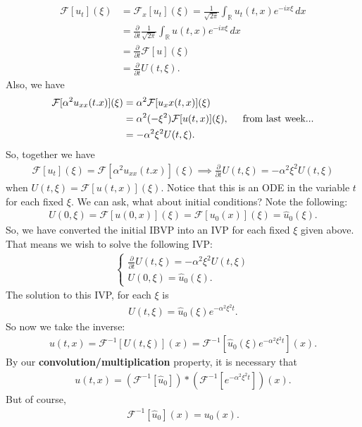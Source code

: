 \documentclass{article}
\theoremstyle{definition}
\newcommand{\p}{\partial}
\newcommand{\R}{\mathbb{R}}
\newcommand{\F}{\mathcal{F}}
\newcommand{\al}{\alpha}
\newcommand{\f}[2]{\frac{#1}{#2}}
\newcommand{\lp}{\left(}
\newcommand{\rp}{\right)}
\newcommand{\lb}{\left[}
\newcommand{\rb}{\right]}
\begin{document}
\begin{align*}
\F[u_t](\xi) &= \F_x[u_t](\xi) = \f{1}{\sqrt{2\pi}}\int_\R u_t(t,x) e^{-i x \xi}\,dx\\
&= \f{\p}{\p t}\f{1}{\sqrt{2\pi}}\int_\R u(t,x)e^{-ix\xi}\,dx\\
&= \f{\p}{\p t}\F[u](\xi)\\
&= \f{\p}{\p t}U(t,\xi).
\end{align*}
Also, we have
\begin{align*}
\F[\alpha^2 u_{xx}(t.x)](\xi) &= \alpha^2 \F[u_xx(t,x)](\xi)\\
&= \alpha^2(-\xi^2)\F[u(t,x)](\xi), \hspace{0.5cm}\text{from last week...}\\
&= -\al^2\xi^2 U(t,\xi).
\end{align*}
So, together we have
\begin{align*}
\F[u_t](\xi) = \F[\alpha^2 u_{xx}(t.x)](\xi) \implies \f{\p}{\p t}U(t,\xi) = -\al^2\xi^2 U(t,\xi)
\end{align*}
when $U(t,\xi) = \F[u(t,x)](\xi)$. Notice that this is an ODE in the variable $t$ for each fixed $\xi$. We can ask, what about initial conditions? Note the following:
\begin{align*}
U(0,\xi) = \F[u(0,x)](\xi) = \F[u_0(x)](\xi) = \hat{u}_0(\xi).
\end{align*}
So, we have converted the initial IBVP into an IVP for each fixed $\xi$ given above. That means we wish to solve the following IVP:
\begin{align}
\begin{cases}
\f{\p}{\p t}U(t,\xi) = -\al^2\xi^2 U(t,\xi) \\
U(0,\xi) = \hat{u}_0(\xi).
\end{cases}
\end{align}
The solution to this IVP, for each $\xi$ is
\begin{align*}
U(t,\xi) = \hat{u}_0(\xi)e^{-\al^2 \xi^2 t}.
\end{align*}
So now we take the inverse:
\begin{align*}
u(t,x) = \F^{-1}[U(t,\xi)](x) = \F^{-1}\lb \hat{u}_0(\xi)e^{-\al^2 \xi^2 t} \rb(x).
\end{align*}
By our \textbf{convolution/multiplication} property, it is necessary that 
\begin{align*}
u(t,x) = \lp \F^{-1}[\hat{u}_0] \rp \ast \lp \F^{-1}\lb e^{-\al^2\xi^2 t} \rb \rp(x).
\end{align*}
But of course,
\begin{align*}
\F^{-1}[\hat{u}_0](x) = u_0(x).
\end{align*}
\end{document}
